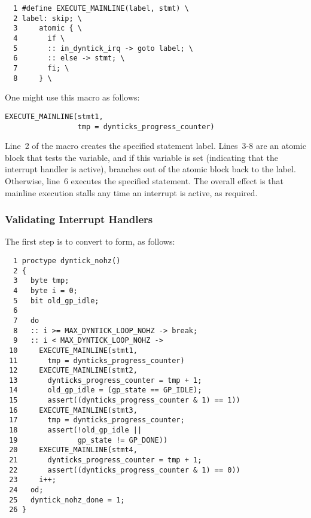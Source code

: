 { \scriptsize
\begin{verbatim}
  1 #define EXECUTE_MAINLINE(label, stmt) \
  2 label: skip; \
  3     atomic { \
  4       if \
  5       :: in_dyntick_irq -> goto label; \
  6       :: else -> stmt; \
  7       fi; \
  8     } \
\end{verbatim}
}

One might use this macro as follows:

\vspace{5pt}
\begin{minipage}[t]{\columnwidth}
\scriptsize
\begin{verbatim}
EXECUTE_MAINLINE(stmt1,
                 tmp = dynticks_progress_counter)
\end{verbatim}
\end{minipage}
\vspace{5pt}

Line~2 of the macro creates the specified statement label.
Lines~3-8 are an atomic block that tests the 
variable, and if this variable is set (indicating that the interrupt
handler is active), branches out of the atomic block back to the
label.
Otherwise, line~6 executes the specified statement.
The overall effect is that mainline execution stalls any time an interrupt
is active, as required.

\subsubsection{Validating Interrupt Handlers}
\label{sec:formal:Validating Interrupt Handlers}

The first step is to convert  to
\co{EXECUTE_MAINLINE()} form, as follows:

{ \scriptsize
\begin{verbatim}
  1 proctype dyntick_nohz()
  2 {
  3   byte tmp;
  4   byte i = 0;
  5   bit old_gp_idle;
  6
  7   do
  8   :: i >= MAX_DYNTICK_LOOP_NOHZ -> break;
  9   :: i < MAX_DYNTICK_LOOP_NOHZ ->
 10     EXECUTE_MAINLINE(stmt1,
 11       tmp = dynticks_progress_counter)
 12     EXECUTE_MAINLINE(stmt2,
 13       dynticks_progress_counter = tmp + 1;
 14       old_gp_idle = (gp_state == GP_IDLE);
 15       assert((dynticks_progress_counter & 1) == 1))
 16     EXECUTE_MAINLINE(stmt3,
 17       tmp = dynticks_progress_counter;
 18       assert(!old_gp_idle ||
 19              gp_state != GP_DONE))
 20     EXECUTE_MAINLINE(stmt4,
 21       dynticks_progress_counter = tmp + 1;
 22       assert((dynticks_progress_counter & 1) == 0))
 23     i++;
 24   od;
 25   dyntick_nohz_done = 1;
 26 }
\end{verbatim}
}

